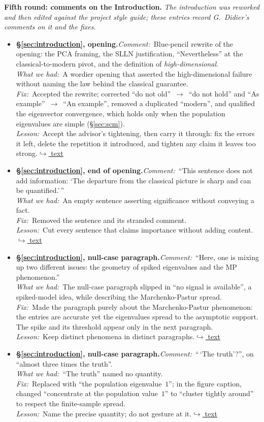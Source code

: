 \documentclass[12pt]{article}
\newcommand{\gdlogentry}[6]{%
  \item[\textcolor{thesisRev}{$\star$\,\ref{gdrev:#1}}]\hypertarget{gdlog:#1}{}%
  \textbf{#2.}\enspace\emph{Comment:}~#3\\
  \emph{What we had:}~#4\\
  \emph{Fix:}~#5\\
  \emph{Lesson:}~#6\enspace\hyperlink{gdtext:#1}{\textcolor{thesisLink}{$\hookrightarrow$ text}}}
\begin{document}
\medskip
\noindent\textbf{Fifth round: comments on the Introduction.} \emph{The introduction was reworked and then edited against the project style guide; these entries record G.\ Didier's comments on it and the fixes.}
\begin{itemize}[leftmargin=2.4em,itemsep=0.55em]
\gdlogentry{intro-blue}{\S\ref{sec:introduction}, opening}{Blue-pencil rewrite of the opening: the PCA framing, the SLLN justification, ``Nevertheless'' at the classical-to-modern pivot, and the definition of \emph{high-dimensional}.}{A wordier opening that asserted the high-dimensional failure without naming the law behind the classical guarantee.}{Accepted the rewrite; corrected ``do not old''~$\to$~``do not hold'' and ``As example''~$\to$~``An example'', removed a duplicated ``modern'', and qualified the eigenvector convergence, which holds only when the population eigenvalues are simple (\S\ref{sec:scm}).}{Accept the advisor's tightening, then carry it through: fix the errors it left, delete the repetition it introduced, and tighten any claim it leaves too strong.}

\gdlogentry{intro-filler}{\S\ref{sec:introduction}, end of opening}{``This sentence does not add information: `The departure from the classical picture is sharp and can be quantified.'\,''}{An empty sentence asserting significance without conveying a fact.}{Removed the sentence and its stranded comment.}{Cut every sentence that claims importance without adding content.}

\gdlogentry{intro-nosignal}{\S\ref{sec:introduction}, null-case paragraph}{``Here, one is mixing up two different issues: the geometry of spiked eigenvalues and the MP phenomenon.''}{The null-case paragraph slipped in ``no signal is available'', a spiked-model idea, while describing the Marchenko-Pastur spread.}{Made the paragraph purely about the Marchenko-Pastur phenomenon: the entries are accurate yet the eigenvalues spread to the asymptotic support. The spike and its threshold appear only in the next paragraph.}{Keep distinct phenomena in distinct paragraphs.}

\gdlogentry{intro-truth}{\S\ref{sec:introduction}, null-case paragraph}{``\,`The truth'?'', on ``almost three times the truth''.}{``The truth'' named no quantity.}{Replaced with ``the population eigenvalue~\(1\)''; in the figure caption, changed ``concentrate at the population value~\(1\)'' to ``cluster tightly around'' to respect the finite-sample spread.}{Name the precise quantity; do not gesture at it.}


\end{itemize}
\end{document}
